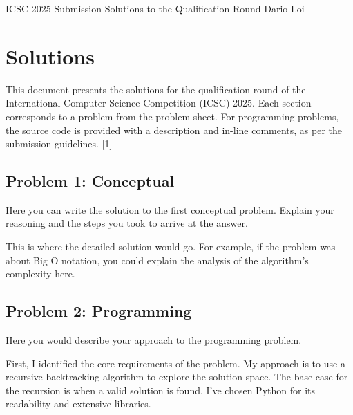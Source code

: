 \documentclass{solutionclass} %
\begin{document}
\pretitle
{ICSC 2025 Submission}                          %
{Solutions to the Qualification Round}          %
{Dario Loi} %

\makeatletter
    \startcontents[sections]
    \chapter{Solutions}
\makeatother

    This document presents the solutions for the qualification round of the International Computer Science Competition (ICSC) 2025. Each section corresponds to a problem from the problem sheet. For programming problems, the source code is provided with a description and in-line comments, as per the submission guidelines. [1]

    \divider

    \section{Problem 1: Conceptual}
    Here you can write the solution to the first conceptual problem. Explain your reasoning and the steps you took to arrive at the answer.

    \begin{solution}
        This is where the detailed solution would go. For example, if the problem was about Big O notation, you could explain the analysis of the algorithm's complexity here.
    \end{solution}

    \section{Problem 2: Programming}
    Here you would describe your approach to the programming problem.

    \begin{solution}
        First, I identified the core requirements of the problem. My approach is to use a recursive backtracking algorithm to explore the solution space. The base case for the recursion is when a valid solution is found. I've chosen Python for its readability and extensive libraries.
    \end{solution}
\end{document}
